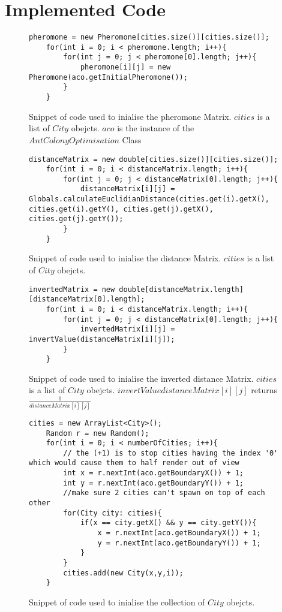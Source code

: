 \chapter{Implemented Code}
\renewcommand{\thechapter}{\Alph{chapter}}

\begin{figure}[H]
\begin{lstlisting}
pheromone = new Pheromone[cities.size()][cities.size()];
	for(int i = 0; i < pheromone.length; i++){
		for(int j = 0; j < pheromone[0].length; j++){
			pheromone[i][j] = new Pheromone(aco.getInitialPheromone());
		}
	}
\end{lstlisting}
\caption{Snippet of code used to inialise the pheromone Matrix. $cities$ is a list of $City$ obejcts. $aco$ is the instance of the $AntColonyOptimisation$ Class}
\label{initPheroCode}
\end{figure}

\begin{figure}[H]
\begin{lstlisting}
distanceMatrix = new double[cities.size()][cities.size()];
	for(int i = 0; i < distanceMatrix.length; i++){
		for(int j = 0; j < distanceMatrix[0].length; j++){
			distanceMatrix[i][j] = Globals.calculateEuclidianDistance(cities.get(i).getX(), cities.get(i).getY(), cities.get(j).getX(), cities.get(j).getY());
		}
	}
\end{lstlisting}
\caption{Snippet of code used to inialise the distance Matrix. $cities$ is a list of $City$ obejcts.}
\label{initDistanceCode}
\end{figure}

\begin{figure}[H]
\begin{lstlisting}
invertedMatrix = new double[distanceMatrix.length][distanceMatrix[0].length];	
	for(int i = 0; i < distanceMatrix.length; i++){
		for(int j = 0; j < distanceMatrix[0].length; j++){
			invertedMatrix[i][j] = invertValue(distanceMatrix[i][j]);
		}
	}
\end{lstlisting}
\caption{Snippet of code used to inialise the inverted distance Matrix. $cities$ is a list of $City$ obejcts. $invertValue{distanceMatrix[i][j]}$ returns $\frac{1}{distanceMatrix[i][j]}$}
\label{initInverteddistanceCode}
\end{figure}

\begin{figure}[H]
\begin{lstlisting}
cities = new ArrayList<City>();
	Random r = new Random();
	for(int i = 0; i < numberOfCities; i++){
		// the (+1) is to stop cities having the index '0' which would cause them to half render out of view
		int x = r.nextInt(aco.getBoundaryX()) + 1;
		int y = r.nextInt(aco.getBoundaryY()) + 1;
		//make sure 2 cities can't spawn on top of each other
		for(City city: cities){
			if(x == city.getX() && y == city.getY()){
				x = r.nextInt(aco.getBoundaryX()) + 1;
				y = r.nextInt(aco.getBoundaryY()) + 1;
			}
		}
		cities.add(new City(x,y,i));	
	}
\end{lstlisting}
\caption{Snippet of code used to inialise the collection of $City$ obejcts.}
\label{initCity}
\end{figure}


